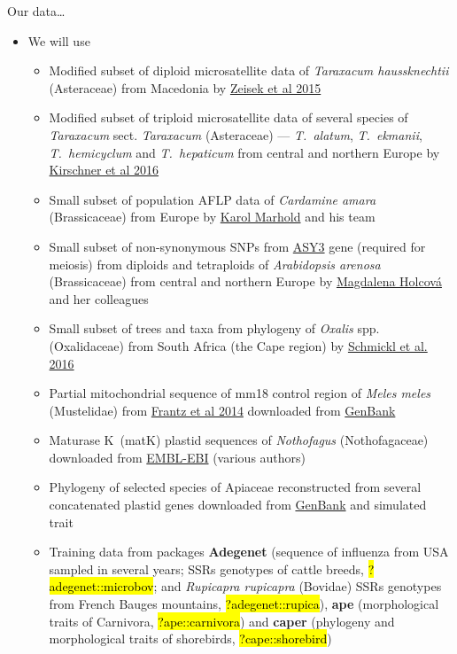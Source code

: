 \documentclass[compress, ucs, xelatex, 11pt, xcolor=svgnames,
  hyperref={
    bookmarks=true,
    unicode=true,
    colorlinks=true,
    pdftitle={Molecular data in R},
    plainpages=false,
    pdfauthor={Vojtech Zeisek},
    pdfsubject={Course about phylogeny and evolution in R},
    pdfcreator={XeLaTeX},
    pdfkeywords={R, evolution, phylogeny, molecular data},
    linkcolor=Tomato,
    anchorcolor=SaddleBrown,
    citecolor=Goldenrod,
    filecolor=DarkMagenta,
    menucolor=Sienna,
    urlcolor=DarkTurquoise,
    pdftex},
  url={hyphens, lowtilde} %
  ]{beamer}
\renewcommand{\texttt}[1]{\hl{\ttfamily #1}}
\begin{document}
\begin{frame}[allowframebreaks]{Our data\ldots}
  \begin{itemize}
    \item We will use
    \begin{itemize}
      \item Modified subset of diploid microsatellite data of \textit{Taraxacum haussknechtii} (Asteraceae) from Macedonia by \href{https://trapa.cz/en/taraxacum-section-dioszegia}{Zeisek et al 2015}
      \item Modified subset of triploid microsatellite data of several species of \textit{Taraxacum} sect. \textit{Taraxacum} (Asteraceae) --- \textit{T.~alatum}, \textit{T.~ekmanii}, \textit{T.~hemicyclum} and \textit{T.~hepaticum} from central and northern Europe by \href{https://trapa.cz/en/identif-oligoclonal-agamospermous-microsp}{Kirschner et al 2016}
      \item Small subset of population AFLP data of \textit{Cardamine amara} (Brassicaceae) from Europe by \href{http://ibot.sav.sk/usr/Karol/}{Karol Marhold} and his team
      \item Small subset of non-synonymous SNPs from \href{https://www.arabidopsis.org/servlets/TairObject?type=locus&name=At2g46980}{ASY3} gene (required for meiosis) from diploids and tetraploids of \textit{Arabidopsis arenosa} (Brassicaceae) from central and northern Europe by \href{https://botany.natur.cuni.cz/ecolgen/people}{Magdalena Holcová} and her colleagues
      \item Small subset of trees and taxa from phylogeny of \textit{Oxalis} spp. (Oxalidaceae) from South Africa (the Cape region) by \href{http://onlinelibrary.wiley.com/doi/10.1111/1755-0998.12487/abstract}{Schmickl et al. 2016}
      \item Partial mitochondrial sequence of mm18 control region of \textit{Meles meles} (Mustelidae) from \href{https://www.nature.com/articles/hdy201445}{Frantz et al 2014} downloaded from \href{https://www.ncbi.nlm.nih.gov/popset/608602125}{GenBank}
      \item Maturase K~(matK) plastid sequences of \textit{Nothofagus} (Nothofagaceae) downloaded from \href{https://www.ebi.ac.uk/}{EMBL-EBI} (various authors)
      \item Phylogeny of selected species of Apiaceae reconstructed from several concatenated plastid genes downloaded from \href{https://www.ncbi.nlm.nih.gov/}{GenBank} and simulated trait
      \item Training data from packages \textbf{Adegenet} (sequence of influenza from USA sampled in several years; SSRs genotypes of cattle breeds, \texttt{?adegenet::microbov}; and \textit{Rupicapra rupicapra} (Bovidae) SSRs genotypes from French Bauges mountains, \texttt{?adegenet::rupica}), \textbf{ape} (morphological traits of Carnivora, \texttt{?ape::carnivora}) and \textbf{caper} (phylogeny and morphological traits of shorebirds, \texttt{?cape::shorebird})

\end{itemize}
\end{itemize}
\end{frame}
\end{document}
